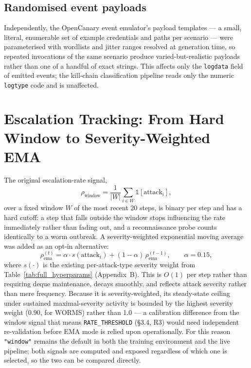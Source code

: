 \subsection{Randomised event payloads}

Independently, the OpenCanary event emulator's payload templates --- a
small, literal, enumerable set of example credentials and paths per
scenario --- were parameterised with wordlists and jitter ranges resolved
at generation time, so repeated invocations of the same scenario produce
varied-but-realistic payloads rather than one of a handful of exact
strings. This affects only the \texttt{logdata} field of emitted events;
the kill-chain classification pipeline reads only the numeric
\texttt{logtype} code and is unaffected.

\section{Escalation Tracking: From Hard Window to Severity-Weighted EMA}

The original escalation-rate signal,
\begin{equation}
  \rho_{\text{window}} = \frac{1}{|W|}\sum_{i \in W} \mathbb{1}[\text{attack}_i],
\end{equation}
over a fixed window $W$ of the most recent 20 steps, is binary per step
and has a hard cutoff: a step that falls outside the window stops
influencing the rate immediately rather than fading out, and a
reconnaissance probe counts identically to a worm outbreak. A
severity-weighted exponential moving average was added as an opt-in
alternative:
\begin{equation}
  \rho_{\text{ema}}^{(t)} = \alpha \cdot s(\text{attack}_t) + (1-\alpha)\,\rho_{\text{ema}}^{(t-1)},
  \qquad \alpha = 0.15,
\end{equation}
where $s(\cdot)$ is the existing per-attack-type severity weight from
Table~\ref{tab:full_hyperparams} (Appendix~B). This is $O(1)$ per step
rather than requiring deque maintenance, decays smoothly, and reflects
attack severity rather than mere frequency. Because it is
severity-weighted, its steady-state ceiling under sustained
maximal-severity activity is bounded by the highest severity weight
(0.90, for WORMS) rather than 1.0 --- a calibration difference from the
window signal that means \texttt{RATE\_THRESHOLD} (\S3.4, R3) would need
independent re-validation before EMA mode is relied upon operationally.
For this reason \texttt{"window"} remains the default in both the
training environment and the live pipeline; both signals are computed
and exposed regardless of which one is selected, so the two can be
compared directly.

